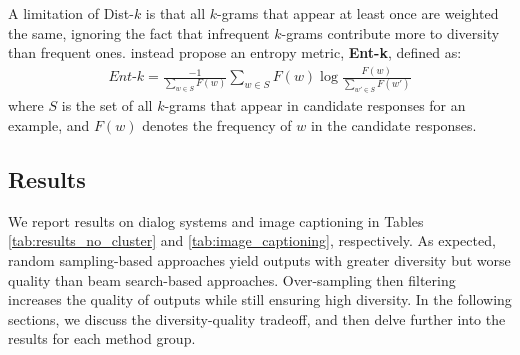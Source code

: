 A limitation of Dist-$k$ is that all $k$-grams that appear at least once are weighted the same, ignoring the fact that infrequent $k$-grams contribute more to diversity than frequent ones. 
\citet{zhang2018generating} instead propose an entropy metric, \textbf{Ent-k}, defined as:
 \begin{align*}
 \textit{Ent-k} = \frac{-1} {\sum_{w \in S}F(w)} \sum_{w \in S} F(w) \log \frac{F(w)} {\sum_{w' \in S} F(w')}
 \end{align*}
 where $S$ is the set of all $k$-grams that appear in candidate responses for an example, and $F(w)$ denotes the frequency of $w$ in the candidate responses.

\subsection{Results}
We report results on dialog systems and image captioning in Tables \ref{tab:results_no_cluster} and \ref{tab:image_captioning}, respectively. As expected, random sampling-based approaches yield outputs with greater diversity but worse quality than beam search-based approaches.
Over-sampling then filtering increases the quality of outputs while still ensuring high diversity. 
In the following sections, we discuss the diversity-quality tradeoff, and then delve further into the results for each method group.

